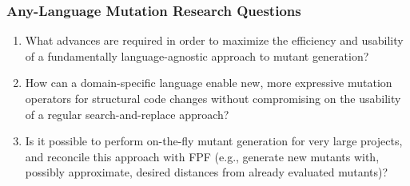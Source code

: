 \subsubsection{Any-Language Mutation Research Questions}

\begin{enumerate}
\item What advances are required in order to maximize the efficiency and usability of a
  fundamentally language-agnostic approach to
  mutant generation?
\item How can a domain-specific language
enable new, more expressive mutation operators for
structural code changes
without compromising on the usability of a %
regular
search-and-replace approach?
\item Is it possible to perform on-the-fly mutant generation for very
  large projects, and reconcile this approach with FPF (e.g., generate
  new mutants with, possibly approximate, desired distances from
  already evaluated mutants)?
\end{enumerate}


